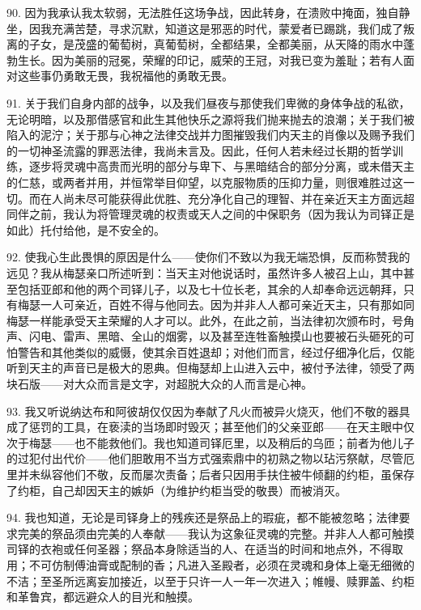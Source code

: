 90. 因为我承认我太软弱，无法胜任这场争战，因此转身，在溃败中掩面，独自静坐，因我充满苦楚，寻求沉默，知道这是邪恶的时代，蒙爱者已踢跳，我们成了叛离的子女，是茂盛的葡萄树，真葡萄树，全都结果，全都美丽，从天降的雨水中蓬勃生长。因为美丽的冠冕，荣耀的印记，威荣的王冠，对我已变为羞耻；若有人面对这些事仍勇敢无畏，我祝福他的勇敢无畏。\par

91. 关于我们自身内部的战争，以及我们昼夜与那使我们卑微的身体争战的私欲，无论明暗，以及那借感官和此生其他快乐之源将我们抛来抛去的浪潮；关于我们被陷入的泥泞；关于那与心神之法律交战并力图摧毁我们内天主的肖像以及赐予我们的一切神圣流露的罪恶法律，我尚未言及。因此，任何人若未经过长期的哲学训练，逐步将灵魂中高贵而光明的部分与卑下、与黑暗结合的部分分离，或未借天主的仁慈，或两者并用，并恒常举目仰望，以克服物质的压抑力量，则很难胜过这一切。而在人尚未尽可能获得此优胜、充分净化自己的理智、并在亲近天主方面远超同伴之前，我认为将管理灵魂的权责或天人之间的中保职务（因为我认为司铎正是如此）托付给他，是不安全的。\par

92. 使我心生此畏惧的原因是什么——使你们不致以为我无端恐惧，反而称赞我的远见？我从梅瑟亲口所述听到：当天主对他说话时，虽然许多人被召上山，其中甚至包括亚郎和他的两个司铎儿子，以及七十位长老，其余的人却奉命远远朝拜，只有梅瑟一人可亲近，百姓不得与他同去。因为并非人人都可亲近天主，只有那如同梅瑟一样能承受天主荣耀的人才可以。此外，在此之前，当法律初次颁布时，号角声、闪电、雷声、黑暗、全山的烟雾，以及甚至连牲畜触摸山也要被石头砸死的可怕警告和其他类似的威慑，使其余百姓退却；对他们而言，经过仔细净化后，仅能听到天主的声音已是极大的恩典。但梅瑟却上山进入云中，被付予法律，领受了两块石版——对大众而言是文字，对超脱大众的人而言是心神。\par

93. 我又听说纳达布和阿彼胡仅仅因为奉献了凡火而被异火烧灭，他们不敬的器具成了惩罚的工具，在亵渎的当场即时毁灭；甚至他们的父亲亚郎——在天主眼中仅次于梅瑟——也不能救他们。我也知道司铎厄里，以及稍后的乌匝；前者为他儿子的过犯付出代价——他们胆敢用不当方式强索鼎中的初熟之物以玷污祭献，尽管厄里并未纵容他们不敬，反而屡次责备；后者只因用手扶住被牛倾翻的约柜，虽保存了约柜，自己却因天主的嫉妒（为维护约柜当受的敬畏）而被消灭。\par

94. 我也知道，无论是司铎身上的残疾还是祭品上的瑕疵，都不能被忽略；法律要求完美的祭品须由完美的人奉献——我认为这象征灵魂的完整。并非人人都可触摸司铎的衣袍或任何圣器；祭品本身除适当的人、在适当的时间和地点外，不得取用；不可仿制傅油膏或配制的香；凡进入圣殿者，必须在灵魂和身体上毫无细微的不洁；至圣所远离妄加接近，以至于只许一人一年一次进入；帷幔、赎罪盖、约柜和革鲁宾，都远避众人的目光和触摸。\par

